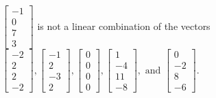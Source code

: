\begin{exerciseAnswer}
\begin{enumerate}[(a)]
\( \left[\begin{array}{c}
-1 \\
0 \\
7 \\
3
\end{array}\right] \) is not a linear combination of the vectors \( \left[\begin{array}{c}
-2 \\
2 \\
2 \\
-2
\end{array}\right] , \left[\begin{array}{c}
-1 \\
2 \\
-3 \\
2
\end{array}\right] , \left[\begin{array}{c}
0 \\
0 \\
0 \\
0
\end{array}\right] , \left[\begin{array}{c}
1 \\
-4 \\
11 \\
-8
\end{array}\right] , \text{ and } \left[\begin{array}{c}
0 \\
-2 \\
8 \\
-6
\end{array}\right] \). 


\end{enumerate}
    
\end{exerciseAnswer}
    
